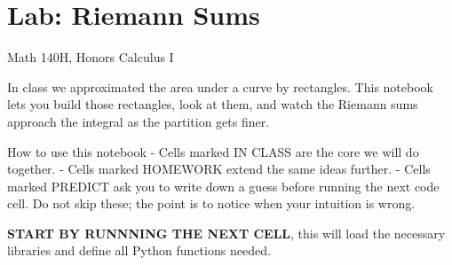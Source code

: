 \documentclass[
  letterpaper,
  DIV=11,
  numbers=noendperiod]{scrreprt}
\theoremstyle{plain}
\theoremstyle{plain}
\theoremstyle{definition}
\theoremstyle{definition}
\theoremstyle{definition}
\theoremstyle{plain}
\theoremstyle{plain}
\theoremstyle{remark}
\begin{document}
\chapter{Lab: Riemann Sums}\label{lab-riemann-sums}

Math 140H, Honors Calculus I

In class we approximated the area under a curve by rectangles. This
notebook lets you build those rectangles, look at them, and watch the
Riemann sums approach the integral as the partition gets finer.

How to use this notebook - Cells marked IN CLASS are the core we will do
together. - Cells marked HOMEWORK extend the same ideas further. - Cells
marked PREDICT ask you to write down a guess before running the next
code cell. Do not skip these; the point is to notice when your intuition
is wrong.

\textbf{START BY RUNNNING THE NEXT CELL}, this will load the necessary
libraries and define all Python functions needed.
\end{document}

